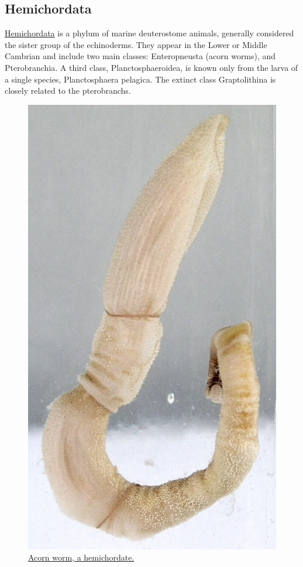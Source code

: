 \hypertarget{hemichordata}{%
\subsection{Hemichordata}\label{hemichordata}}

\href{https://en.wikipedia.org/wiki/Hemichordate}{Hemichordata} is a phylum of marine deuterostome animals, generally considered the sister group of the echinoderms. They appear in the Lower or Middle Cambrian and include two main classes: Enteropneusta (acorn worms), and Pterobranchia. A third class, Planctosphaeroidea, is known only from the larva of a single species, Planctosphaera pelagica. The extinct class Graptolithina is closely related to the pterobranchs.



\begin{figure}

{\centering \includegraphics[width=0.7\linewidth]{./figures/animals/Eichelwurm_(cropped)} 

}

\caption{\href{https://commons.wikimedia.org/wiki/File:Eichelwurm_(cropped).jpg}{Acorn worm, a hemichordate.}}\label{fig:hemichordate}
\end{figure}

